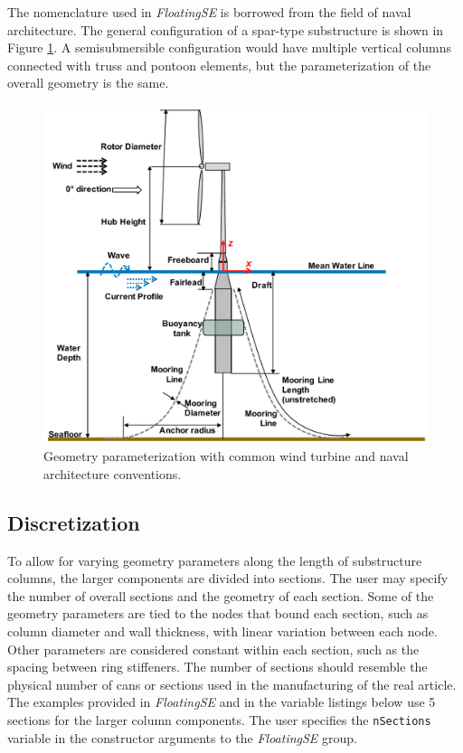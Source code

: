 The nomenclature used in \textit{FloatingSE} is borrowed from the field
of naval architecture.  The general configuration of a spar-type
substructure is shown in Figure \ref{fig:diagram}.  A semisubmersible
configuration would have multiple vertical columns connected with
truss and pontoon elements, but the parameterization of the overall
geometry is the same.
\begin{figure}
  \begin{center}
    \includegraphics[width=5in]{figs/diagram}
    \caption{Geometry parameterization with common wind turbine and
      naval architecture conventions.}
    \label{fig:diagram}
  \end{center}
\end{figure}

\subsection{Discretization}
To allow for varying geometry parameters along the length of
substructure columns, the larger components are divided into sections.
The user may specify the number of overall sections and the geometry of
each section.  Some of the geometry parameters are tied to the nodes
that bound each section, such as column diameter and wall thickness,
with linear variation between each node.  Other parameters are
considered constant within each section, such as the spacing between
ring stiffeners.  The number of sections should resemble the physical
number of cans or sections used in the manufacturing of the real
article.  The examples provided in \textit{FloatingSE} and in the variable
listings below use 5 sections for the larger column components.  The
user specifies the \texttt{nSections} variable in the constructor
arguments to the \textit{FloatingSE} group.

